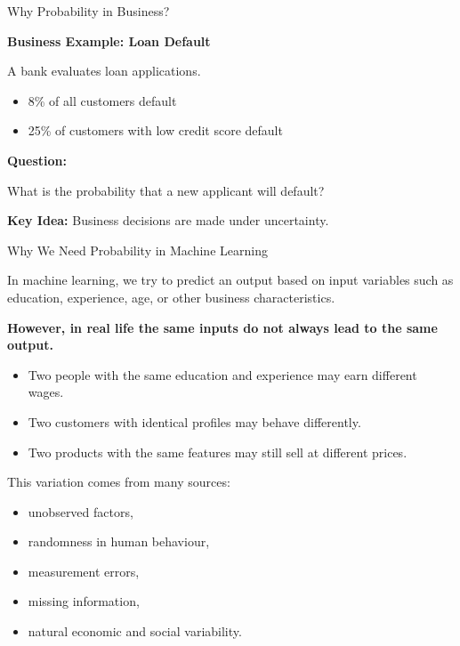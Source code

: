\documentclass{beamer}
\begin{document}
\begin{frame}{Why Probability in Business?}

\textbf{Business Example: Loan Default}

A bank evaluates loan applications.

\begin{itemize}
    \item 8\% of all customers default
    \item 25\% of customers with low credit score default
\end{itemize}

\vspace{0.3cm}

\textbf{Question:}
\begin{center}
What is the probability that a new applicant will default?
\end{center}

\vspace{0.5cm}

\textbf{Key Idea:} Business decisions are made under uncertainty.

\end{frame}
\begin{frame}{Why We Need Probability in Machine Learning}

In machine learning, we try to predict an output based on input variables such as 
education, experience, age, or other business characteristics.

\medskip

\textbf{However, in real life the same inputs do not always lead to the same output.}

\begin{itemize}
    \item Two people with the same education and experience may earn different wages.
    \item Two customers with identical profiles may behave differently.
    \item Two products with the same features may still sell at different prices.
\end{itemize}

\medskip

This variation comes from many sources:

\begin{itemize}
    \item unobserved factors,
    \item randomness in human behaviour,
    \item measurement errors,
    \item missing information,
    \item natural economic and social variability.
\end{itemize}

\end{frame}
\end{document}
